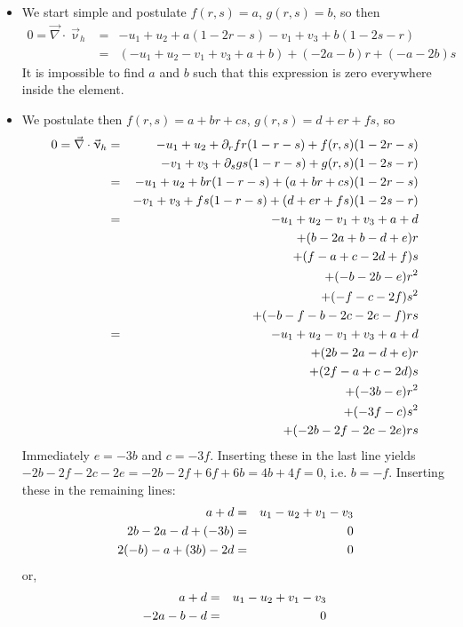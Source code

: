 \begin{itemize}
\item
We start simple and postulate $f(r,s)=a$, $g(r,s)=b$, so then 
\begin{eqnarray}
0=\vec\nabla\cdot\vec\upnu_h 
&=&   -u_1+u_2 +  a(1-2r-s) -v_1+v_3 +  b(1-2s-r) \\
&=&  (-u_1+u_2-v_1+v_3 +a +b ) + (-2a-b)r + (-a-2b)s
\end{eqnarray}
It is impossible to find $a$ and $b$ such that this expression is zero everywhere inside the element.

\item
We postulate then $f(r,s)=a+br+cs$, $g(r,s)=d+er+fs$, so  
\begin{eqnarray}
0=\vec\nabla\cdot\vec\upnu_h 
&=& -u_1+u_2 + \partial_r f r(1-r-s) + f(r,s)(1-2r-s) \nonumber\\
&&  -v_1+v_3 + \partial_s g s(1-r-s) + g(r,s)(1-2s-r) \nonumber\\
&=& -u_1+u_2 + b r(1-r-s) + (a+br+cs) (1-2r-s) \nonumber\\
&&  -v_1+v_3 + f s(1-r-s) + (d+er+fs)(1-2s-r) \nonumber\\
&=& -u_1+u_2  -v_1+v_3 + a + d \nonumber\\
&& +(b-2a+b-d+e)r \nonumber\\
&& +(f-a+c-2d+f)s \nonumber\\
&& +(-b-2b-e)r^2 \nonumber\\
&& +(-f-c-2f)s^2 \nonumber\\
&& +(-b-f-b-2c-2e-f)rs \nonumber\\
&=& -u_1+u_2  -v_1+v_3 + a + d \nonumber\\
&& +(2b-2a-d+e)r \nonumber\\
&& +(2f-a+c-2d)s \nonumber\\
&& +(-3b-e)r^2 \nonumber\\
&& +(-3f-c)s^2 \nonumber\\
&& +(-2b-2f-2c-2e)rs  \nonumber
\end{eqnarray}
Immediately $e=-3b$ and $c=-3f$. Inserting these in the last line yields
$-2b-2f-2c-2e=-2b-2f+6f+6b=4b+4f=0$, i.e. $b=-f$.
Inserting these in the remaining lines:
\begin{eqnarray}
a+d &=& u_1-u_2  +v_1-v_3 \nonumber\\
2b-2a-d+(-3b) &=& 0 \nonumber\\
2(-b)-a+(3b)-2d &=& 0 \nonumber
\end{eqnarray}
or,
\begin{eqnarray}
a+d &=& u_1-u_2  +v_1-v_3 \nn\\
-2a-b-d &=& 0 \nn\\

\end{eqnarray}
\end{itemize}
